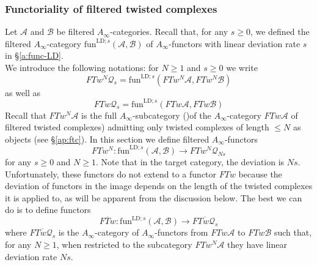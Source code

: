 \subsubsection{Functoriality of filtered twisted complexes}
Let $\mathcal{A}$ and $\mathcal{B}$ be filtered $A_\infty$-categories. Recall that, for any $s\geq 0$, we defined the filtered $A_\infty$-category $\text{fun}^{\text{LD};s}(\mathcal{A}, \mathcal{B})$ of $A_\infty$-functors with linear deviation rate $s$ in \S\ref{a:func-LD}.\\
We introduce the following notations: for $N\geq 1$ and $s\geq0$ we write \begin{equation}\label{eq:FTwNQ}
	FTw^N\mathcal{Q}_s= \text{fun}^{\text{LD};s}(FTw^N\mathcal{A}, FTw^N\mathcal{B})
\end{equation} as well as $$FTw\mathcal{Q}_s= \text{fun}^{\text{LD};s}(FTw\mathcal{A}, FTw\mathcal{B})$$ Recall that $FTw^N\mathcal{A}$ is the full $A_\infty$-subcategory ()of the $A_\infty$-category $FTw\mathcal{A}$ of filtered twisted complexes) admitting only twisted complexes of length $\leq N$ as objects (see \S\ref{ap:ftc}). In this section we define filtered $A_\infty$-functors $$FTw^N\colon \text{fun}^{\text{LD};s}(\mathcal{A}, \mathcal{B})\to FTw^N\mathcal{Q}_{Ns}$$ for any $s\geq 0$ and $N\geq 1$. Note that in the target category, the deviation is $Ns$. Unfortunately, these functors do not extend to a functor $FTw$ because the deviation of functors in the image depends on the length of the twisted complexes it is applied to, as will be apparent from the discussion below. The best we can do is to define functors $$\overline{FTw}\colon \text{fun}^{\text{LD};s}(\mathcal{A}, \mathcal{B})\to \overline{FTw\mathcal{Q}_s}$$ where $\overline{FTw\mathcal{Q}_s}$ is the $A_\infty$-category of $A_\infty$-functors from $FTw\mathcal{A}$ to $FTw\mathcal{B}$ such that, for any $N\geq 1$, when restricted to the subcategory $FTw^N\mathcal{A}$ they have linear deviation rate $Ns$.\\

